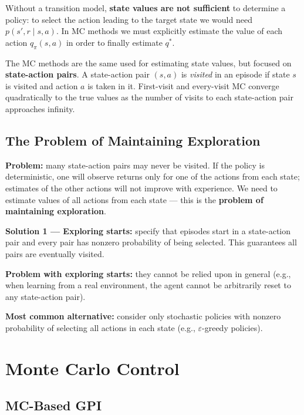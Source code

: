 \documentclass[11pt,a4paper]{article}
\theoremstyle{definition}
\theoremstyle{plain}
\theoremstyle{remark}
\begin{document}
Without a transition model, \textbf{state values are not sufficient} to determine a policy: to select the action leading to the target state we would need $p(s', r \mid s, a)$. In MC methods we must explicitly estimate the value of each action $q_\pi(s, a)$ in order to finally estimate $q^*$.

The MC methods are the same used for estimating state values, but focused on \textbf{state-action pairs}. A state-action pair $(s, a)$ is \textit{visited} in an episode if state $s$ is visited and action $a$ is taken in it. First-visit and every-visit MC converge quadratically to the true values as the number of visits to each state-action pair approaches infinity.

\subsection{The Problem of Maintaining Exploration}

\textbf{Problem:} many state-action pairs may never be visited. If the policy is deterministic, one will observe returns only for one of the actions from each state; estimates of the other actions will not improve with experience. We need to estimate values of all actions from each state — this is the \textbf{problem of maintaining exploration}.

\textbf{Solution 1 — Exploring starts:} specify that episodes start in a state-action pair and every pair has nonzero probability of being selected. This guarantees all pairs are eventually visited.

\begin{tcolorbox}[colback=orange!5!white, colframe=orange!75!black]
\textbf{Problem with exploring starts:} they cannot be relied upon in general (e.g., when learning from a real environment, the agent cannot be arbitrarily reset to any state-action pair).

\textbf{Most common alternative:} consider only stochastic policies with nonzero probability of selecting all actions in each state (e.g., $\varepsilon$-greedy policies).
\end{tcolorbox}

\section{Monte Carlo Control}

\subsection{MC-Based GPI}
\end{document}
